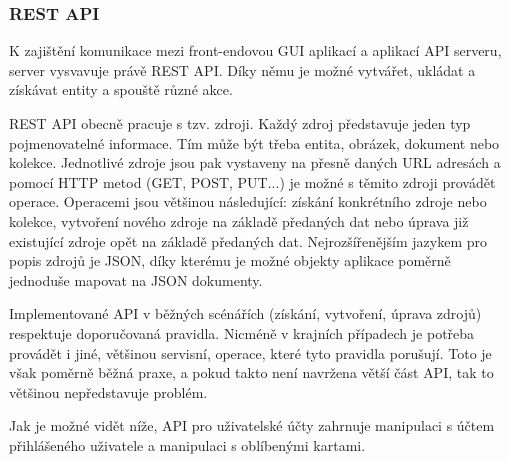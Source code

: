 		\subsubsection{REST API}

		K zajištění komunikace mezi front-endovou \ac{GUI} aplikací a aplikací \ac{API} serveru, server
		vysvavuje právě \ac{REST} \ac{API}.
		Díky němu je možné vytvářet, ukládat a získávat entity a spouště různé akce.

		\ac{REST} \ac{API} obecně pracuje s tzv. zdroji.
		Každý zdroj představuje jeden typ pojmenovatelné informace.
		Tím může být třeba entita, obrázek, dokument nebo kolekce.
		Jednotlivé zdroje jsou pak vystaveny na přesně daných \ac{URL} adresách a pomocí \ac{HTTP} metod (GET, POST, PUT...)
		je možné s těmito zdroji provádět operace.
		Operacemi jsou většinou následující: získání konkrétního zdroje nebo kolekce, vytvoření nového zdroje na základě
		předaných dat nebo úprava již existující zdroje opět na základě předaných dat.
		Nejrozšířenějším jazykem pro popis zdrojů je \ac{JSON}, díky kterému je možné objekty aplikace poměrně jednoduše
		mapovat na \ac{JSON} dokumenty. \cite{restfulapi}

		Implementované \ac{API} v běžných scénářích (získání, vytvoření, úprava zdrojů) respektuje doporučovaná pravidla.
		Nicméně v krajních případech je potřeba provádět i jiné, většinou servisní, operace, které tyto pravidla porušují.
		Toto je však poměrně běžná praxe, a pokud takto není navržena větší část \ac{API}, tak to většinou nepředstavuje
		problém.

		Jak je možné vidět níže, \ac{API} pro uživatelské účty zahrnuje manipulaci s účtem přihlášeného uživatele a manipulaci
		s oblíbenými kartami.

